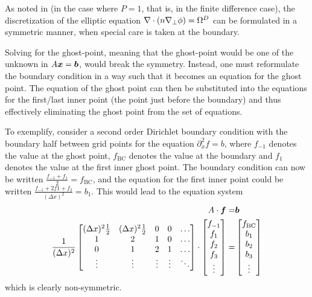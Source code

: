 As noted in \cite{Wiesenberger2014Phd} (in the case where $P=1$, that is, in the finite difference case), the discretization of the elliptic equation $\nabla\cdot\left(n\nabla_\perp\phi\right)=\Omega^D$ can be formulated in a symmetric manner, when special care is taken at the boundary.

Solving for the ghost-point, meaning that the ghost-point would be one of the unknown in $A\boldsymbol{x}=\boldsymbol{b}$, would break the symmetry.
Instead, one must reformulate the boundary condition in a way such that it becomes an equation for the ghost point.
The equation of the ghost point can then be substituted into the equations for the first/last inner point (the point just before the boundary) and thus effectively eliminating the ghost point from the set of equations.

To exemplify, consider a second order Dirichlet boundary condition with the boundary half between grid points for the equation $\partial_x^2 f = b$, where $f_{-1}$ denotes the value at the ghost point, $f_{\text{BC}}$ denotes the value at the boundary and $f_{1}$ denotes the value at the first inner ghost point.
The boundary condition can now be written $\frac{f_{-1}+f_{1}}{2}=f_{\text{BC}}$, and the equation for the first inner point could be written $\frac{f_{-1}+2f{1}+f_{2}}{(\Delta x)^2}=b_1$.
This would lead to the equation system
%
\begin{align*}
    A\cdot\boldsymbol{f}=&\boldsymbol{b}\\
    \frac{1}{(\Delta x)^2}
    \begin{bmatrix}
        (\Delta x)^2\frac{1}{2} & (\Delta x)^2\frac{1}{2} & 0 & 0 & \ldots\\
        1                       & 2                       & 1 & 0 & \ldots\\
        0                       & 1                       & 2 & 1 & \ldots\\
        \vdots                  & \vdots              &\vdots&\vdots&\ddots\\
    \end{bmatrix}
    \cdot
    \begin{bmatrix}
        f_{-1}\\
        f_{1}\\
        f_{2}\\
        f_{3}\\
        \vdots
    \end{bmatrix}
    =&
    \begin{bmatrix}
        f_{\text{BC}}\\
        b_{1}\\
        b_{2}\\
        b_{3}\\
        \vdots
    \end{bmatrix}
\end{align*}
%
which is clearly non-symmetric.

